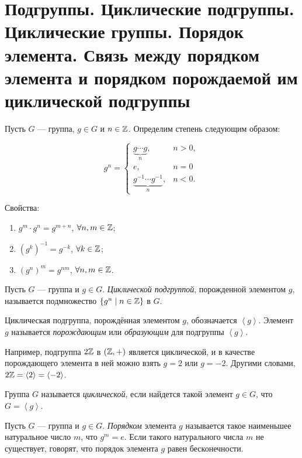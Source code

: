 \section{Подгруппы. Циклические подгруппы. Циклические группы. Порядок элемента. Связь между порядком элемента и порядком порождаемой им циклической подгруппы}

Пусть $G$ --- группа, $g \in G$ и $n \in \mathbb{Z}$. Определим степень следующим образом:

\begin{equation*}
    g^n = \begin{cases}
        \underbrace{g \cdots g}_n, &n > 0, \\
        e, &n = 0 \\
        \underbrace{g^{-1} \cdots g^{-1}}_n, &n < 0.
    \end{cases}
\end{equation*}

Свойства:
\begin{enumerate}
\item $g^{m} \cdot g^{n} = g^{m + n}$, $\forall n, m \in \mathbb{Z}$;
\item $\left(g^{k}\right)^{-1} = g^{-k}$, $\forall k \in \mathbb{Z}$;
\item $\left(g^{n}\right)^{m} = g^{nm}$, $\forall n, m \in \mathbb{Z}$.
\end{enumerate}

\begin{definition}
    Пусть $G$ --- группа и $g \in G$. \textit{Циклической подгруппой}, порожденной элементом $g$, называется подмножество $ \{g^{n} \mid n \in \mathbb{Z}\}$ в $G$.

    Циклическая подгруппа, порождённая элементом $g$, обозначается $\left< g \right>$. Элемент $g$ называется \textit{порождающим} или \textit{образующим} для подгруппы $\left< g \right>$.
\end{definition}

Например, подгруппа $2\mathbb{Z}$ в $(\mathbb{Z}, +)$ является циклической, и в качестве порождающего элемента в ней можно взять $g = 2$ или $g = -2$. Другими словами, $2\mathbb{Z} = \left< 2 \right> = \left< -2 \right>$.

\begin{definition}
    Группа $G$ называется \textit{циклической}, если найдется такой элемент $g \in G$, что $G = \left< g \right>$.
\end{definition}

\begin{definition}
    Пусть $G$ --- группа и $g \in G$. \textit{Порядком} элемента $g$ называется такое наименьшее натуральное число $m$, что $g^{m} = e$. Если такого натурального числа $m$ не существует, говорят, что порядок элемента $g$ равен бесконечности.
\end{definition}


